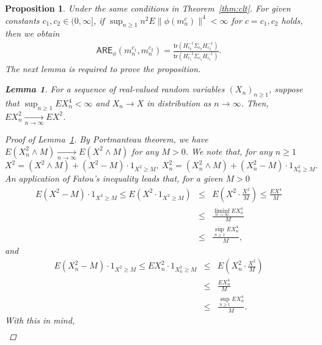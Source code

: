 \documentclass[preprint]{imsart}
\theoremstyle{plain}
\newtheorem{lemma}{Lemma}
\newtheorem{proposition}{Proposition}
\theoremstyle{remark}
\begin{document}
\begin{appendix}
\begin{proposition}\label{prop:tech:supp}
Under the same conditions in Theorem~\ref{thm:clt}. For given constants $c_{1}, c_{2} \in (0, \infty]$, if $\sup_{n \ge 1}n^2 E \|\phi(m^{c}_{n})\|^4 < \infty$ for $c=c_{1}, c_{2}$ holds, then we obtain
\begin{eqnarray*}
\textsf{ARE}_{\phi}(m^{c_{1}}_{n}, m^{c_{2}}_{n}) %
=\frac{\textsf{tr}(H_{c_{2}}^{-1}\Sigma_{c_{2}} H_{c_{2}}^{-1})}{\textsf{tr}(H_{c_{1}}^{-1}\Sigma_{c_{1}} H_{c_{1}}^{-1})}.
\end{eqnarray*}
The next lemma is required to prove the proposition.
\begin{lemma}\label{lem:moment}
For a sequence of real-valued random variables $(X_n)_{n \ge 1}$, suppose that $\sup_{n \ge 1} EX^{4}_{n} < \infty$ and $X_{n} \to X$ in distribution as $n \to \infty$. Then, $EX^2_{n} \underset{n \to \infty}{\to} EX^2$.
\begin{proof}[Proof of Lemma~\ref{lem:moment}]
By Portmanteau theorem, we have $E(X^{2}_{n} \wedge M) \underset{n \to \infty}{\to} E(X^{2} \wedge M)$ for any $M>0$. We note that, for any $n\ge 1$ 
$$
X^2 = (X^2 \wedge M) + (X^2 - M) \cdot 1_{X^2 \ge M},~ X_{n}^2 = (X_{n}^2 \wedge M) + (X_{n}^2 - M) \cdot 1_{X_{n}^2 \ge M}. 
$$
An application of Fatou's inequality leads that, for a given $M>0$
\begin{eqnarray*}
E(X^2-M) \cdot 1_{X^2 \ge M} \le E(X^2 \cdot 1_{X^2 \ge M}) &\le& E(X^2 \cdot \frac{X^2}{M})
\le \frac{EX^4}{M} \\
&\le& \frac{\liminf_{n\to \infty}EX^{4}_{n}}{M} \\
&\le& \frac{\sup_{n \ge 1} EX^{4}_{n}}{M},
\end{eqnarray*}
and 
\begin{eqnarray*}
E(X_{n}^2-M)\cdot 1_{X^2 \ge M} \le EX_{n}^2 \cdot 1_{X_{n}^2 \ge M} &\le&  E(X_{n}^2 \cdot \frac{X^2}{M}) \\
&\le& \frac{EX_{n}^4}{M} \\
&\le& \frac{\sup_{n \ge 1} EX_{n}^{4}}{M}.
\end{eqnarray*}
With this in mind,
\begin{eqnarray*}

\end{eqnarray*}
\end{proof}
\end{lemma}
\end{proposition}
\end{appendix}
\end{document}
